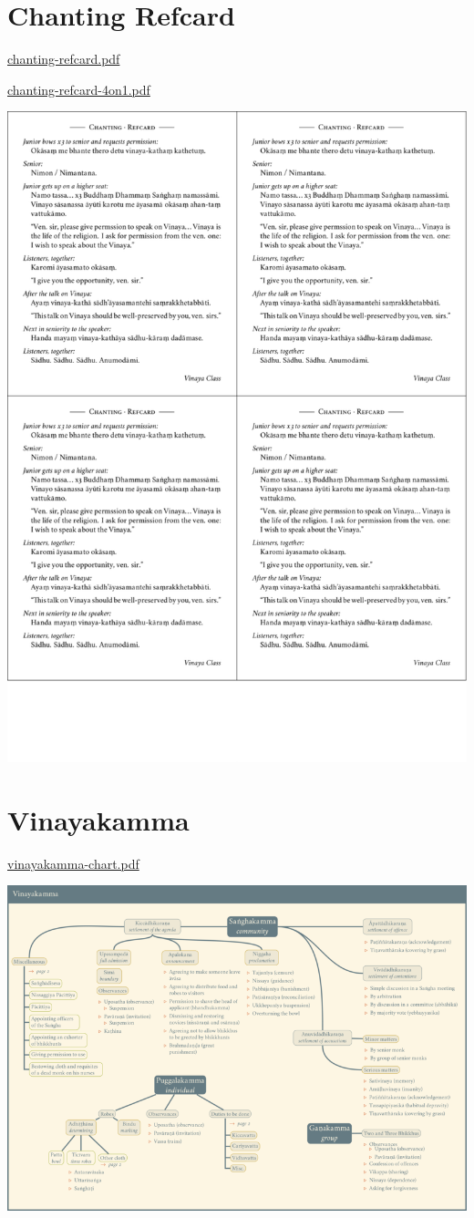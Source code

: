\section{Chanting Refcard}

\href{./includes/docs/chanting-refcard.pdf}{chanting-refcard.pdf}

\href{./includes/docs/chanting-refcard-4on1.pdf}{chanting-refcard-4on1.pdf}

\href{./includes/docs/chanting-refcard-4on1.pdf}{\includegraphics{./includes/docs/chanting-refcard-4on1-thumb.png}}

\section{Vinayakamma}

\href{./includes/docs/vinayakamma-chart.pdf}{vinayakamma-chart.pdf}

\href{./includes/docs/vinayakamma-chart.pdf}{\includegraphics{./includes/docs/vinayakamma-chart-thumb.png}}

